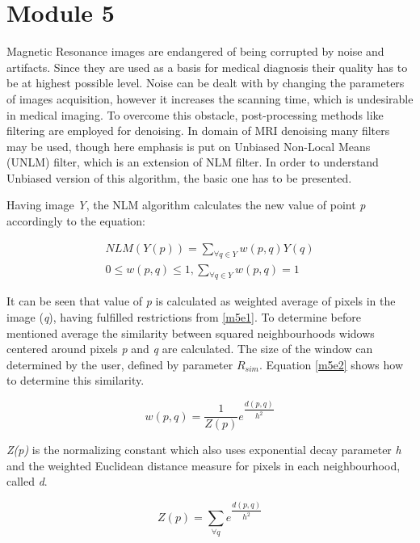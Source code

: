 \section{Module 5}
Magnetic Resonance images are endangered of being corrupted by noise and artifacts. Since they are used as a basis for medical diagnosis their quality has to be at highest possible level. Noise can be dealt with by changing the parameters of images acquisition, however it increases the scanning time, which is undesirable in medical imaging. To overcome this obstacle, post-processing methods like filtering are employed for denoising. In domain of MRI denoising many filters may be used, though here emphasis is put on Unbiased Non-Local Means (UNLM) filter, which is an extension of NLM filter. In order to understand Unbiased version of this algorithm, the basic one has to be presented.

Having image \textit{Y}, the NLM algorithm calculates the new value of point \textit{p} accordingly to the equation:

\begin{equation}
\begin{aligned}
NLM(Y(p)) = \sum_{\forall q \in Y}^{}w(p,q)Y(q) \\
0 \le w(p,q) \le 1 , 
\sum_{\forall q \in Y}^{}w(p,q) = 1
\end{aligned}
\label{m5e1}
\end{equation}

It can be seen that value of \textit{p} is calculated as weighted average of pixels in the image (\textit{q}), having fulfilled restrictions from \ref{m5e1}. To determine before mentioned average the similarity between squared neighbourhoods widows centered around pixels \textit{p} and \textit{q} are calculated. The size of the window can determined by the user, defined by parameter $R_{sim}$. Equation \ref{m5e2} shows how to determine this similarity.

\begin{equation}
w(p,q) = \frac{1}{Z(p)}e^{\dfrac{d(p,q)}{h^2}}
\label{m5e2}
\end{equation}

\textit{Z(p)} is the normalizing constant which also uses exponential decay parameter \textit{h} and the weighted Euclidean distance measure for pixels in each neighbourhood, called \textit{d}.

\begin{equation}
Z(p) = \sum_{\forall q}^{} e^{\dfrac{d(p,q)}{h^2}}
\label{m5e5}
\end{equation}

